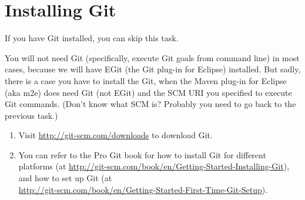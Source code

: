 
\section{Installing Git}

If you have Git installed, you can skip this task.

You will not need Git (specifically, execute Git goals from command line) in most cases, because we will have EGit (the Git plug-in for Eclipse) installed. But sadly, there is a case you have to install the Git, when the Maven plug-in for Eclipse (aka m2e) does need Git (not EGit) and the SCM URI you specified to execute Git commands. (Don't know what SCM is? Probably you need to go back to the previous task.)

\begin{enumerate}
\item Visit \url{http://git-scm.com/downloads} to download Git.
\item You can refer to the Pro Git book for how to install Git for different platforms (at \url{http://git-scm.com/book/en/Getting-Started-Installing-Git}), and how to set up Git (at \\\url{http://git-scm.com/book/en/Getting-Started-First-Time-Git-Setup}).
\end{enumerate}